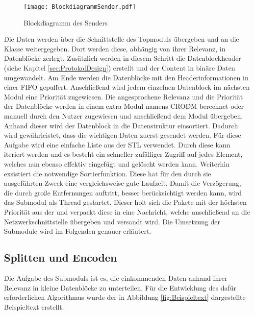 \begin{figure}[H]
	\centering
	\texttt{[image: BlockdiagrammSender.pdf]} %
	\caption{Blockdiagramm des Senders}
	\label{fig:BlockdiagrammSender}
\end{figure}

Die Daten werden {\"u}ber die Schnittstelle des Topmoduls 
{\"u}bergeben und an die Klasse  weitergegeben. Dort
werden diese, abh{\"a}ngig von ihrer Relevanz, in Datenbl{\"o}cke zerlegt.
Zus{\"a}tzlich werden in diesem Schritt die Datenblockheader (siehe Kapitel
\ref{sec:ProtokolDesign}) erstellt und der Content in bin{\"a}re Daten
umgewandelt. Am Ende werden die Datenbl{\"o}cke mit den Headerinformationen in
einer \gls{FIFO} gepuffert.
Anschließend wird jedem einzelnen Datenblock im n{\"a}chsten Modul eine
Priorit{\"a}t zugewiesen. Die angesprochene Relevanz und die Priorit{\"a}t der
Datenbl{\"o}cke werden in einem extra Modul namens \gls{CRODM} berechnet oder
manuell durch den Nutzer zugewiesen und anschließend dem Modul 
{\"u}bergeben.
Anhand dieser wird der Datenblock in die Datenstruktur
 einsortiert. Dadurch wird gew{\"a}hrleistet, dass
die wichtigen Daten zuerst gesendet werden. F{\"u}r diese Aufgabe wird eine
einfache Liste aus der \gls{STL} verwendet. Durch diese kann iteriert werden und
es besteht ein schneller zufälliger Zugriff auf jedes Element, welches nun
ebenso effektiv eingefügt und gelöscht werden kann.
Weiterhin exsistiert die notwendige Sortierfunktion. Diese hat f{\"u}r den durch sie
ausgef{\"u}hrten Zweck eine vergleichsweise gute Laufzeit.
Damit die Verz{\"o}gerung, die durch gro{\ss}e Entfernungen auftritt, besser
ber{\"u}cksichtigt werden kann, wird das Submodul  als Thread
gestartet.
Dieser holt sich die Pakete mit der h{\"o}chsten Priorit{\"a}t aus der
 und verpackt diese in eine Nachricht, welche
anschlie{\ss}end an die Netzwerkschnittstelle {\"u}bergeben und versandt wird.
\newline Die Umsetzung der Submodule wird im Folgenden genauer
erl{\"a}utert.

\subsection{Splitten und Encoden}

Die Aufgabe des Submoduls  ist es, die einkommenden Daten
anhand ihrer Relevanz in kleine Datenbl{\"o}cke zu unterteilen. F{\"u}r die Entwicklung
des daf{\"u}r erforderlichen Algorithmus wurde der in
Abbildung \ref{fig:Beispieltext} dargestellte Beispieltext erstellt.

